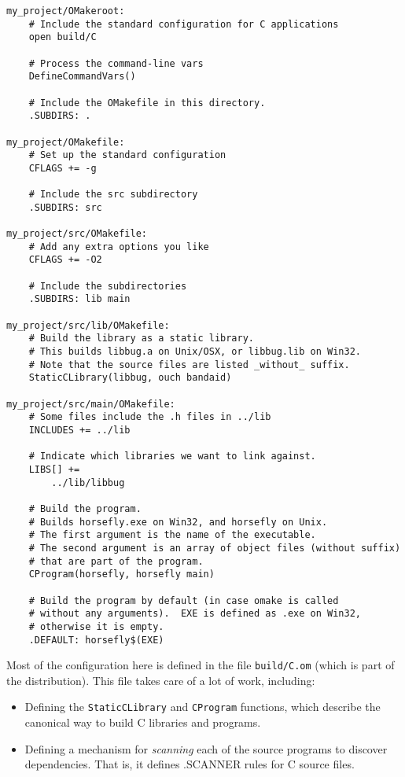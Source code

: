 \begin{verbatim}
my_project/OMakeroot:
    # Include the standard configuration for C applications
    open build/C
    
    # Process the command-line vars
    DefineCommandVars()
    
    # Include the OMakefile in this directory.
    .SUBDIRS: .

my_project/OMakefile:
    # Set up the standard configuration
    CFLAGS += -g

    # Include the src subdirectory
    .SUBDIRS: src

my_project/src/OMakefile:
    # Add any extra options you like
    CFLAGS += -O2

    # Include the subdirectories
    .SUBDIRS: lib main

my_project/src/lib/OMakefile:
    # Build the library as a static library.
    # This builds libbug.a on Unix/OSX, or libbug.lib on Win32.
    # Note that the source files are listed _without_ suffix.
    StaticCLibrary(libbug, ouch bandaid)

my_project/src/main/OMakefile:
    # Some files include the .h files in ../lib
    INCLUDES += ../lib

    # Indicate which libraries we want to link against.
    LIBS[] +=
        ../lib/libbug

    # Build the program.
    # Builds horsefly.exe on Win32, and horsefly on Unix.
    # The first argument is the name of the executable.
    # The second argument is an array of object files (without suffix)
    # that are part of the program.
    CProgram(horsefly, horsefly main)

    # Build the program by default (in case omake is called
    # without any arguments).  EXE is defined as .exe on Win32,
    # otherwise it is empty.
    .DEFAULT: horsefly$(EXE)
\end{verbatim}

Most of the configuration here is defined in the file \verb+build/C.om+ (which is part of the \OMake{}
distribution).  This file takes care of a lot of work, including:
\begin{itemize}
\item Defining the \verb+StaticCLibrary+ and \verb+CProgram+ functions, which describe the canonical
way to build C libraries and programs.
\item Defining a mechanism for \emph{scanning} each of the source programs to discover dependencies.
That is, it defines .SCANNER rules for C source files.
\end{itemize}


